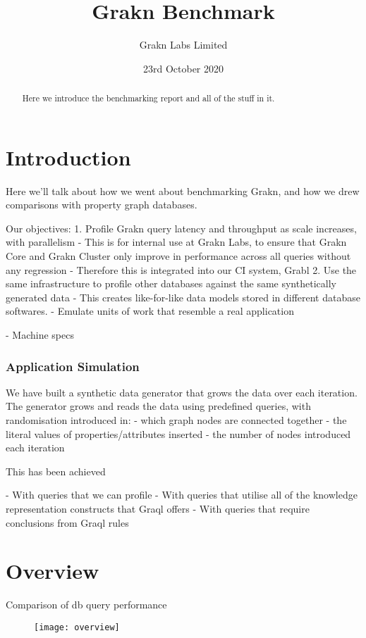\documentclass{article}
\begin{document}
\title{Grakn Benchmark}
\date{23rd October 2020}
\author{Grakn Labs Limited}

\maketitle

\begin{abstract}
Here we introduce the benchmarking report and all of the stuff in it.
\end{abstract}

\section{Introduction}
Here we'll talk about how we went about benchmarking Grakn, and how we drew comparisons with property graph databases.

Our objectives:
1. Profile Grakn query latency and throughput as scale increases, with parallelism
    - This is for internal use at Grakn Labs, to ensure that Grakn Core and Grakn Cluster only improve in performance across all queries without any regression
    - Therefore this is integrated into our CI system, Grabl
2. Use the same infrastructure to profile other databases against the same synthetically generated data
    - This creates like-for-like data models stored in different database softwares.
    - Emulate units of work that resemble a real application

- Machine specs

\subsubsection{Application Simulation}

We have built a synthetic data generator that grows the data over each iteration. The generator grows and reads the data using predefined queries, with randomisation introduced in:
- which graph nodes are connected together
- the literal values of properties/attributes inserted
- the number of nodes introduced each iteration

This has been achieved

- With queries that we can profile
- With queries that utilise all of the knowledge representation constructs that Graql offers
- With queries that require conclusions from Graql rules


\section{Overview}
Comparison of db query performance

\begin{figure}[H]
\centering
\texttt{[image: overview]}
\end{figure}
\end{document}
